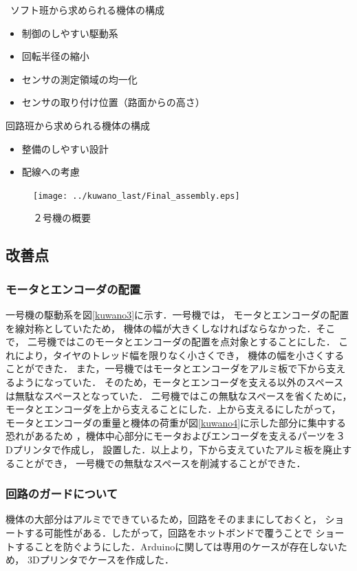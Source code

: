 \documentclass[11pt,a4]{jsarticle}
\begin{document}
\
ソフト班から求められる機体の構成
\begin{itemize}
 \item 制御のしやすい駆動系
 \item 回転半径の縮小
 \item センサの測定領域の均一化
 \item センサの取り付け位置（路面からの高さ）
\end{itemize}

回路班から求められる機体の構成
\begin{itemize}
 \item 整備のしやすい設計
 \item 配線への考慮
\end{itemize}

\begin{figure}[t]
\begin{center}
  \texttt{[image: ../kuwano\_last/Final\_assembly.eps]}
\end{center}
\caption{２号機の概要}
\label{assembly}
\end{figure}

\subsection{改善点}
\subsubsection{モータとエンコーダの配置}
一号機の駆動系を図\ref{kuwano3}に示す．一号機では，
モータとエンコーダの配置を線対称としていたため，
機体の幅が大きくしなければならなかった．そこで，
二号機ではこのモータとエンコーダの配置を点対象とすることにした．
これにより，タイヤのトレッド幅を限りなく小さくでき，
機体の幅を小さくすることができた．
また，一号機ではモータとエンコーダをアルミ板で下から支えるようになっていた．
そのため，モータとエンコーダを支える以外のスペースは無駄なスペースとなっていた．
二号機ではこの無駄なスペースを省くために，
モータとエンコーダを上から支えることにした．上から支えるにしたがって，
モータとエンコーダの重量と機体の荷重が図\ref{kuwano4}に示した部分に集中する恐れがあるため
，機体中心部分にモータおよびエンコーダを支えるパーツを３Dプリンタで作成し，
設置した．以上より，下から支えていたアルミ板を廃止することができ，
一号機での無駄なスペースを削減することができた．

\subsubsection{回路のガードについて}
機体の大部分はアルミでできているため，回路をそのままにしておくと，
ショートする可能性がある．したがって，回路をホットボンドで覆うことで
ショートすることを防ぐようにした．Arduinoに関しては専用のケースが存在しないため，
3Dプリンタでケースを作成した．
\end{document}
